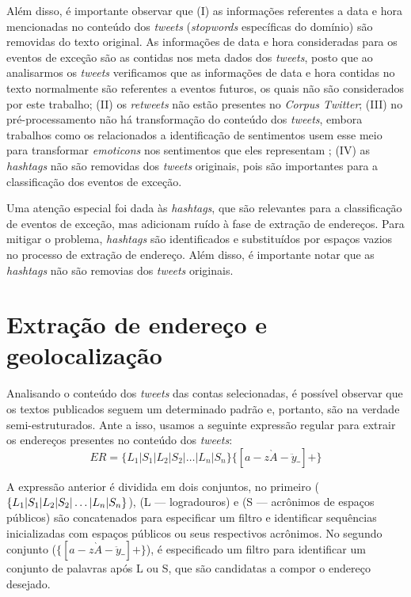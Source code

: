 \documentclass[
	12pt,				%
	oneside,			%
	a4paper,			%
	english,			%
	brazil				%
	]{abntex2ppgsi}
\begin{document}
Além disso, é importante observar que (I) as informações referentes a data e hora mencionadas no conteúdo dos \textit{tweets} (\textit{stopwords} específicas do domínio) são removidas do texto original. As informações de data e hora consideradas para os eventos de exceção são as contidas nos meta dados dos \textit{tweets}, posto que ao analisarmos os \textit{tweets} verificamos que as informações de data e hora contidas no texto normalmente são referentes a eventos futuros, os quais não são considerados por este trabalho; (II) os \textit{retweets} não estão presentes no \textit{Corpus Twitter}; (III) no pré-processamento não há transformação do conteúdo dos \textit{tweets}, embora trabalhos como os relacionados a identificação de sentimentos usem esse meio para transformar \textit{emoticons} nos sentimentos que eles representam \cite{Zagal2016}; (IV) as \textit {hashtags} não são removidas dos \textit{tweets} originais, pois são importantes para a classificação dos eventos de exceção.

Uma atenção especial foi dada às \textit{hashtags}, que são relevantes para a classificação de eventos de exceção, mas adicionam ruído à fase de extração de endereços. Para mitigar o problema, \textit{hashtags} são identificados e substituídos por espaços vazios no processo de extração de endereço. Além disso, é importante notar que as \textit{hashtags} não são removias dos \textit{tweets} originais.

\section{Extração de endereço e geolocalização}

Analisando o conteúdo dos \textit{tweets} das contas selecionadas, é possível observar que os textos publicados seguem um determinado padrão e, portanto, são na verdade semi-estruturados. Ante a isso, usamos a seguinte expressão regular para extrair os endereços presentes no conteúdo dos \textit{tweets}:
%
\begin{equation}
ER = \lbrace L_1 | S_1 | L_2 | S_2 | \dots | L_n | S_n \rbrace \lbrace [a-z\grave{A}-\ddot{y}\_] + \rbrace
\end{equation}

A expressão anterior é dividida em dois conjuntos, no primeiro ($\lbrace L_1 | S_1 | L_2 | S_2 | \newline \dots | L_n | S_n \rbrace $), (L --- logradouros) e (S --- acrônimos de espaços públicos) são concatenados para especificar um filtro e identificar sequências inicializadas com espaços públicos ou seus respectivos acrônimos. No segundo conjunto ($\lbrace [a-z\grave{A}-\ddot{y}\_] + \rbrace $), é especificado um filtro para identificar um conjunto de palavras após L ou S, que são candidatas a compor o endereço desejado.
\end{document}
